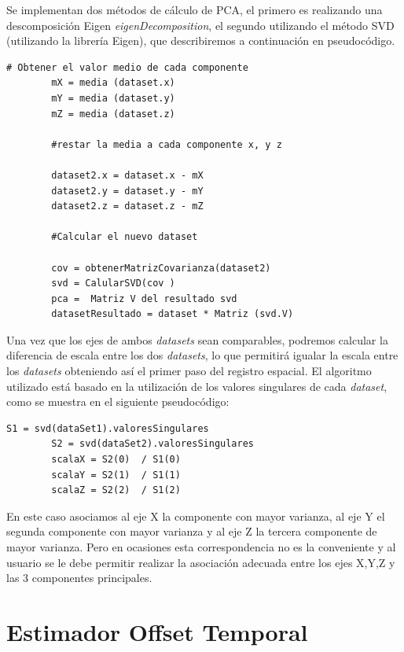 	Se implementan dos métodos de cálculo de PCA, el primero es realizando una descomposición Eigen \textit{eigenDecomposition}, el segundo utilizando el método SVD (utilizando la librería Eigen), que describiremos a continuación en pseudocódigo.

	\begin{lstlisting}[frame=single]
		# Obtener el valor medio de cada componente
		mX = media (dataset.x)
		mY = media (dataset.y)
		mZ = media (dataset.z)

		#restar la media a cada componente x, y z

		dataset2.x = dataset.x - mX
		dataset2.y = dataset.y - mY
		dataset2.z = dataset.z - mZ
        
        #Calcular el nuevo dataset

		cov = obtenerMatrizCovarianza(dataset2)
		svd = CalularSVD(cov )
		pca =  Matriz V del resultado svd
		datasetResultado = dataset * Matriz (svd.V)

	\end{lstlisting}

    Una vez que los ejes de ambos \textit{datasets} sean comparables, podremos calcular la diferencia de escala entre los dos \textit{datasets}, lo que permitirá igualar la escala entre los \textit{datasets} obteniendo así el primer paso del registro espacial. El algoritmo utilizado está basado en la utilización de los valores singulares de cada \textit{dataset}, como se muestra en el siguiente pseudocódigo:

        
	\begin{lstlisting}[frame=single]
		S1 = svd(dataSet1).valoresSingulares
		S2 = svd(dataSet2).valoresSingulares
		scalaX = S2(0)  / S1(0)
		scalaY = S2(1)  / S1(1)
		scalaZ = S2(2)  / S1(2)
	\end{lstlisting}

	En este caso asociamos al eje X la componente con mayor varianza, al eje Y el segunda componente con mayor varianza y al eje Z la tercera componente de mayor varianza. Pero en ocasiones esta correspondencia no es la conveniente y al usuario se le debe permitir realizar la asociación adecuada entre los ejes X,Y,Z y las 3 componentes principales.




\section{Estimador Offset Temporal}

